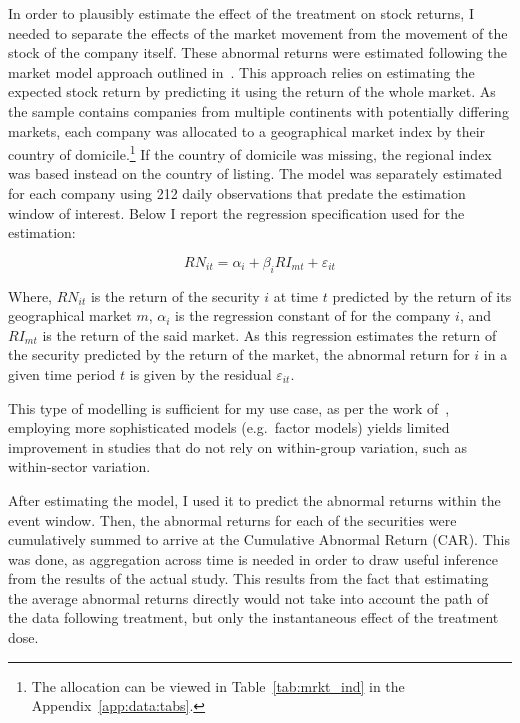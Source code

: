 \documentclass[12pt]{article}
\begin{document}

In order to plausibly estimate the effect of the treatment on stock returns, I needed to separate the effects of the market movement from the movement of the stock of the company itself. These abnormal returns were estimated following the market model approach outlined in~\textcite{mackinlayEventStudiesEconomics1997}. This approach relies on estimating the expected stock return by predicting it using the return of the whole market. As the sample contains companies from multiple continents with potentially differing markets, each company was allocated to a geographical market index by their country of domicile.\footnote{The allocation can be viewed in Table~\ref{tab:mrkt_ind} in the Appendix~\ref{app:data:tabs}.} If the country of domicile was missing, the regional index was based instead on the country of listing. The model was separately estimated for each company using 212 daily observations that predate the estimation window of interest. Below I report the regression specification used for the estimation:

\begin{equation}\label{eq:reg_market_model}
    RN_{it} = \alpha_i + \beta_{i} RI_{mt} + \varepsilon_{it}
\end{equation}

Where, $RN_{it}$ is the return of the security $i$ at time $t$ predicted by the return of its geographical market $m$, $\alpha_i$ is the regression constant of for the company $i$, and $RI_{mt}$ is the return of the said market. As this regression estimates the return of the security predicted by the return of the market, the abnormal return for $i$ in a given time period $t$ is given by the residual $\varepsilon_{it}$.

This type of modelling is sufficient for my use case, as per the work of~\textcite{mackinlayEventStudiesEconomics1997}, employing more sophisticated models (e.g.~factor models) yields limited improvement in studies that do not rely on within-group variation, such as within-sector variation.

After estimating the model, I used it to predict the abnormal returns within the event window. Then, the abnormal returns for each of the securities were cumulatively summed to arrive at the Cumulative Abnormal Return (CAR). This was done, as aggregation across time is needed in order to draw useful inference from the results of the actual study. This results from the fact that estimating the average abnormal returns directly would not take into account the path of the data following treatment, but only the instantaneous effect of the treatment dose.
\end{document}
